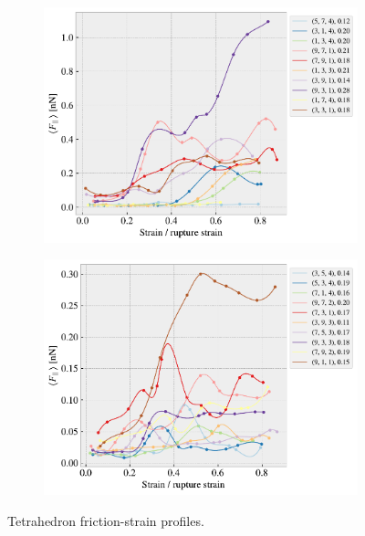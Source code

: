 \begin{figure}[H]
\begin{subfigure}[b]{0.49\textwidth}
        \includegraphics[width=\textwidth]{figures/stretch_profiles/popup/SP_4_popup.pdf}
        \caption{}
    \end{subfigure}
    \hfill
    \begin{subfigure}[b]{0.49\textwidth}
        \centering
        \includegraphics[width=\textwidth]{figures/stretch_profiles/popup/SP_5_popup.pdf}
        \caption{}
    \end{subfigure}
    \hfill
    \caption{Tetrahedron friction-strain profiles.}\label{fig:fric_strain_pop}
\end{figure}



